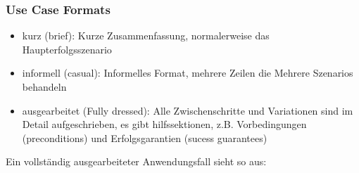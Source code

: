 \documentclass[ngerman,color=3b]{tuda_summary}
\begin{document}
\subsubsection{Use Case Formats}
\begin{itemize}
    \item kurz (brief): Kurze Zusammenfassung, normalerweise das Haupterfolgsszenario
    \item informell (casual): Informelles Format, mehrere Zeilen die Mehrere Szenarios behandeln
    \item ausgearbeitet (Fully dressed): Alle Zwischenschritte und Variationen sind im Detail aufgeschrieben, es gibt hilfssektionen, z.B. Vorbedingungen (preconditions) und Erfolgsgarantien (sucess guarantees)
\end{itemize}
Ein vollständig ausgearbeiteter Anwendungsfall sieht so aus:
\end{document}
